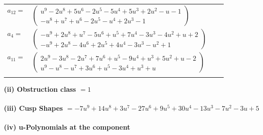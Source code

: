 \documentclass[1p]{elsarticle_modified}
\theoremstyle{definition}
\begin{document}
\begin{tabular}{m{7pt} m{180pt} m{7pt} m{180pt} }
\flushright $a_{12}=$&$\begin{pmatrix}u^9-2 u^8+5 u^6-2 u^5-5 u^4+5 u^3+2 u^2- u-1\\- u^8+u^7+u^6-2 u^5- u^4+2 u^3-1\end{pmatrix}$ \\
\flushright $a_{4}=$&$\begin{pmatrix}- u^9+2 u^8+u^7-5 u^6+u^5+7 u^4-3 u^3-4 u^2+u+2\\- u^9+2 u^8-4 u^6+2 u^5+4 u^4-3 u^3- u^2+1\end{pmatrix}$ \\
\flushright $a_{11}=$&$\begin{pmatrix}2 u^9-3 u^8-2 u^7+7 u^6+u^5-9 u^4+u^3+5 u^2+u-2\\u^9- u^8- u^7+3 u^6+u^5-3 u^4+u^3+u\end{pmatrix}$\\&\end{tabular}
\flushleft \textbf{(ii) Obstruction class $= 1$}\\~\\
\flushleft \textbf{(iii) Cusp Shapes $= -7 u^9+14 u^8+3 u^7-27 u^6+9 u^5+30 u^4-13 u^3-7 u^2-3 u+5$}\\~\\
\newpage\renewcommand{\arraystretch}{1}
\flushleft \textbf{(iv) u-Polynomials at the component}\newline \\
\end{document}
